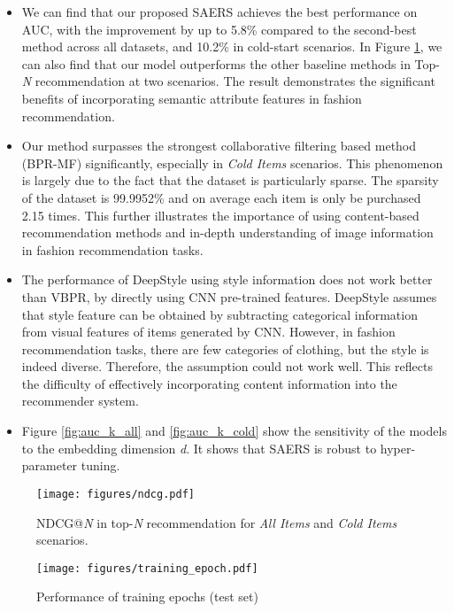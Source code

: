 \documentclass{article}
\begin{document}
\begin{itemize}[leftmargin=*,itemsep=2.5pt]
	\setlength{\itemsep}{0pt}
	\setlength{\parsep}{0pt}
	\setlength{\parskip}{0pt}
\item We can find that our proposed SAERS achieves the best performance on AUC, with the improvement by up to 5.8\% compared to the second-best method across all datasets, and 10.2\% in cold-start scenarios. In Figure \ref{fig:ndcg}, we can also find that our model outperforms the other baseline methods in Top-\textit{N} recommendation at two scenarios. The result demonstrates the significant benefits of incorporating semantic attribute features in fashion recommendation.
\item Our method surpasses the strongest collaborative filtering based method (BPR-MF) significantly, especially in \textit{Cold Items} scenarios. This phenomenon is largely due to the fact that the dataset is particularly sparse. The sparsity of the dataset is 99.9952\% and on average each item is only be purchased 2.15 times. This further illustrates the importance of using content-based recommendation methods and in-depth understanding of image information in fashion recommendation tasks.
\item The performance of DeepStyle using style information does not work better than VBPR, by directly using CNN pre-trained features. DeepStyle assumes that style feature can be obtained by subtracting categorical information from visual features of items generated by CNN. However, in fashion recommendation tasks, there are few categories of clothing, but the style is indeed diverse. Therefore, the assumption could not work well. This reflects the difficulty of effectively incorporating content information into the recommender system.
\item Figure \ref{fig:auc_k_all} and \ref{fig:auc_k_cold} show the sensitivity of the models to the embedding dimension \textit{d}. It shows that SAERS is robust to hyper-parameter tuning.
\end{itemize}


\begin{figure}
\texttt{[image: figures/ndcg.pdf]}\caption{NDCG@\textit{N} in top-\textit{N} recommendation for \textit{All Items} and \textit{Cold Items} scenarios.}
\label{fig:ndcg}
\end{figure}



\begin{figure}
\centering
\texttt{[image: figures/training\_epoch.pdf]}\caption{Performance of training epochs (test set)}
\label{fig:auc}
\centering
\bigskip
\end{figure}
\end{document}
